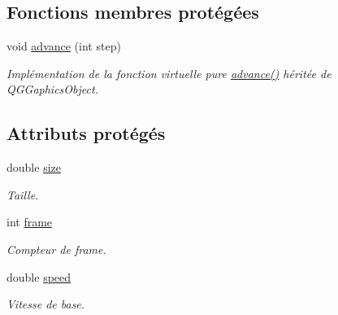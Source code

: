 \subsection*{Fonctions membres protégées}
\begin{DoxyCompactItemize}
\item 
void \hyperlink{classBug_a8e0ea03e85c9324a13328da60e5c52ee}{advance} (int step)
\begin{DoxyCompactList}\small\item\em Implémentation de la fonction virtuelle pure \hyperlink{classBug_a8e0ea03e85c9324a13328da60e5c52ee}{advance()} héritée de QGGaphicsObject. \end{DoxyCompactList}\end{DoxyCompactItemize}
\subsection*{Attributs protégés}
\begin{DoxyCompactItemize}
\item 
double \hyperlink{classBug_a27a0f0b84d15525e409955509e6e3c42}{size}
\begin{DoxyCompactList}\small\item\em Taille. \end{DoxyCompactList}\item 
int \hyperlink{classBug_ad7e3597cf049f1051be94fcaf2fd3598}{frame}
\begin{DoxyCompactList}\small\item\em Compteur de frame. \end{DoxyCompactList}\item 
double \hyperlink{classBug_a13b95fbf23748ea853b01bfd0b0e7fc8}{speed}
\begin{DoxyCompactList}\small\item\em Vitesse de base. \end{DoxyCompactList}\end{DoxyCompactItemize}
